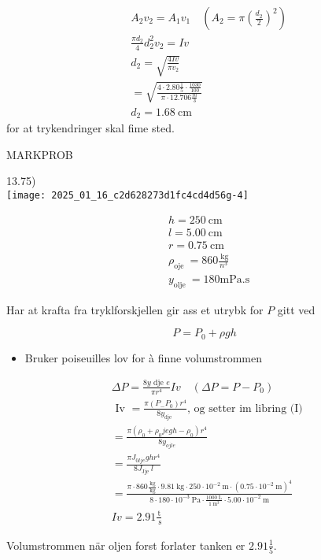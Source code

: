 \documentclass[10pt]{article}
\begin{document}
$$
\begin{aligned}
& A_{2} v_{2}=A_{1} v_{1} \quad\left(A_{2}=\pi\left(\frac{d_{2}}{2}\right)^{2}\right) \\
& \frac{\pi d_{2}}{4} d_{2}^{2} v_{2}=I v \\
& d_{2}=\sqrt{\frac{4 I v}{\pi v_{2}}} \\
& =\sqrt{\frac{4 \cdot 2.80 \frac{1}{5} \cdot \frac{1030}{100}}{\pi \cdot 12.706 \frac{m}{3}}} \\
& d_{2}=1.68 \mathrm{~cm}
\end{aligned}
$$ for at trykendringer skal fime sted.

MARKPROB

13.75)\\
\texttt{[image: 2025\_01\_16\_c2d628273d1fc4cd4d56g-4]}

$$
\begin{aligned}
& h=250 \mathrm{~cm} \\
& l=5.00 \mathrm{~cm} \\
& r=0.75 \mathrm{~cm} \\
& \rho_{\text {oje }}=860 \frac{\mathrm{~kg}}{n^{3}} \\
& y_{\text {olje }}=180 \mathrm{mPa} . \mathrm{s}
\end{aligned}
$$

Har at krafta fra tryklforskjellen gir ass et utrybk for $P$ gitt ved

$$
P=P_{0}+\rho g h
$$

\begin{itemize}
  \item Bruker poiseuilles lov for à finne volumstrommen
\end{itemize}

$$
\begin{aligned}
& \Delta P=\frac{8 y \text { dje } e}{\pi r^{4}} I v \quad\left(\Delta P=P-P_{0}\right) \\
& \text { Iv }=\frac{\pi\left(P_{-} P_{0}\right) r^{4}}{8 y_{\text {dje }}} \text {, og setter im libring (I) } \\
& =\frac{\pi\left(\rho_{0}+\rho_{0} j e g h-\rho_{0}\right) r^{4}}{8 y_{o j l e}} \\
& =\frac{\pi J_{0 l j e} g h r^{4}}{8 J_{\text {Jje }} l} \\
& =\frac{\pi \cdot 860 \frac{\mathrm{~kg}}{\mathrm{~kg}} \cdot 9.81 \mathrm{~kg} \cdot 250 \cdot 10^{-2} \mathrm{~m} \cdot\left(0.75 \cdot 10^{-2} \mathrm{~m}\right)^{4}}{8 \cdot 180 \cdot 10^{-3} \mathrm{~Pa} \cdot \frac{1000 \mathrm{~L}}{1 \mathrm{~m}^{3}} \cdot 5.00 \cdot 10^{-2} \mathrm{~m}} \\
& I v=2.91 \frac{\mathrm{t}}{\mathrm{~s}}
\end{aligned}
$$

Volumstrommen när oljen forst forlater tanken er $2.91 \frac{1}{5}$.
\end{document}
